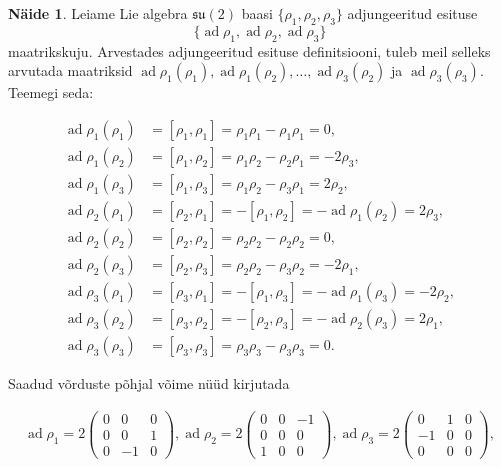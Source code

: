 \documentclass[12pt]{article}
\theoremstyle{plain}
\theoremstyle{definition}
\newtheorem{naide}{Näide}[section]
\numberwithin{equation}{section}
\def\su2{{\mathfrak{ su}\left(2\right)}}
\DeclareMathOperator{\ad}{ad}
\begin{document}
\begin{naide}
Leiame Lie algebra $\su2$ baasi $\{\rho_1, \rho_2, \rho_3\}$ 
adjungeeritud esituse
\[\{\ad \rho_1, \ad \rho_2, \ad \rho_3\}\]
maatrikskuju. Arvestades adjungeeritud esituse definitsiooni, tuleb 
meil selleks arvutada maatriksid $\ad \rho_1 \left(\rho_1\right), 
\ad \rho_1 \left(\rho_2\right), \ldots, 
\ad \rho_3 \left(\rho_2\right)$ ja $\ad \rho_3 \left(\rho_3\right)$. 
Teemegi seda:

\begin{align*}
\ad \rho_1 \left(\rho_1\right) &= \left[\rho_1, \rho_1\right] = 
	\rho_1 \rho_1 - \rho_1 \rho_1 = 0, \\
\ad \rho_1 \left(\rho_2\right) &= \left[\rho_1, \rho_2\right] = 
	\rho_1 \rho_2 - \rho_2 \rho_1 = -2\rho_3, \\
\ad \rho_1 \left(\rho_3\right) &= \left[\rho_1, \rho_3\right] = 
	\rho_1 \rho_2 - \rho_3 \rho_1 = 2\rho_2, \\
\ad \rho_2 \left(\rho_1\right) &= \left[\rho_2, \rho_1\right] = 
	-\left[\rho_1, \rho_2\right] = - \ad \rho_1 \left(\rho_2\right) 
	= 2\rho_3, \\
\ad \rho_2 \left(\rho_2\right) &= \left[\rho_2, \rho_2\right] = 
	\rho_2 \rho_2 - \rho_2 \rho_2 = 0, \\
\ad \rho_2 \left(\rho_3\right) &= \left[\rho_2, \rho_3\right] = 
	\rho_2 \rho_2 - \rho_3 \rho_2 = -2\rho_1, \\
\ad \rho_3 \left(\rho_1\right) &= \left[\rho_3, \rho_1\right] = 
	-\left[\rho_1, \rho_3\right] = - 
	\ad \rho_1 \left(\rho_3\right) = -2\rho_2, \\
\ad \rho_3 \left(\rho_2\right) &= \left[\rho_3, \rho_2\right] = 
	-\left[\rho_2, \rho_3\right] = 
	-\ad \rho_2 \left(\rho_3\right) = 2\rho_1, \\
\ad \rho_3 \left(\rho_3\right) &= \left[\rho_3, \rho_3\right] = 
	\rho_3 \rho_3 - \rho_3 \rho_3 = 0.
\end{align*}

Saadud võrduste põhjal võime nüüd kirjutada

\begin{align*}
\ad \rho_1 = 2\begin{pmatrix}
0 & 0 & 0 \\
0 & 0 & 1 \\
0 & -1 & 0
\end{pmatrix}, 
\ad \rho_2 = 2\begin{pmatrix}
0 & 0 & -1 \\
0 & 0 & 0 \\
1 & 0 & 0
\end{pmatrix}, 
\ad \rho_3 = 2\begin{pmatrix}
0 & 1 & 0 \\
-1 & 0 & 0 \\
0 & 0 & 0
\end{pmatrix},
\end{align*}


\end{naide}
\end{document}
